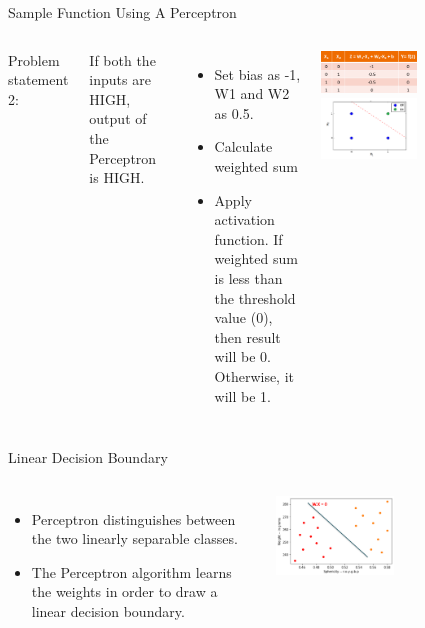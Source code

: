 \documentclass[aspectratio=169,14pt,usenames,dvipsnames]{beamer}
\begin{document}
\begin{frame}{Sample Function Using A Perceptron}
\begin{columns}
\item Problem statement 2: 
\item If both the inputs are HIGH, output of the Perceptron is HIGH.
\begin{itemize}
  \item Set bias as -1, W1 and W2 as 0.5.
  \item Calculate weighted sum
  \item Apply activation function. If weighted sum is less than the threshold\\
   value (0), then result will be 0. Otherwise, it will be 1. 
  
\end{itemize}
\includegraphics[width=0.5\textwidth, height=0.3\textheight]{Images/AIML_Percep_IMG11.png}
\includegraphics[width=0.5\textwidth, height=0.3\textheight]{Images/AIML_Percep_IMG12.png}
\end{columns}
\end{frame}

\begin{frame}{Linear Decision Boundary}
\begin{columns}
\begin{itemize}
\item Perceptron distinguishes between the two linearly separable classes.
\item The Perceptron algorithm learns the weights in order to draw a linear decision boundary.
\end{itemize}
\includegraphics[width=0.5\textwidth, height=0.3\textheight]{Images/AIML_Percep_IMG13.png}
\end{columns}
\end{frame}
\end{document}
